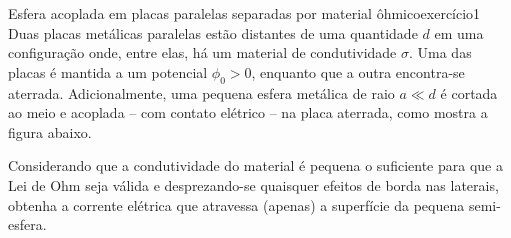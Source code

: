 \begin{exercício}{Esfera acoplada em placas paralelas separadas por material ôhmico}{exercício1}
    Duas placas metálicas paralelas estão distantes de uma quantidade \(d\) em uma configuração onde, entre elas, há um material de condutividade \(\sigma\). Uma das placas é mantida a um potencial \(\phi_0 > 0\), enquanto que a outra encontra-se aterrada. Adicionalmente, uma pequena esfera metálica de raio \(a\ll d\) é cortada ao meio e acoplada -- com contato elétrico -- na placa aterrada, como mostra a figura abaixo.
    \begin{center}
    \end{center}
    Considerando que a condutividade do material é pequena o suficiente para que a Lei de Ohm seja válida e desprezando-se quaisquer efeitos de borda nas laterais, obtenha a corrente elétrica que atravessa (apenas) a superfície da pequena semi-esfera.
\end{exercício}
